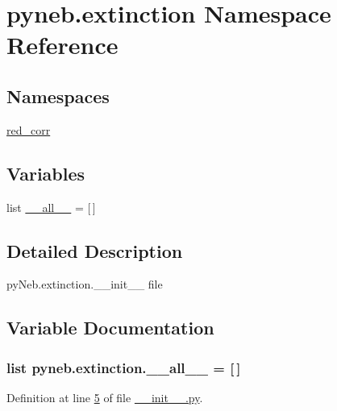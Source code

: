 \hypertarget{namespacepyneb_1_1extinction}{}\section{pyneb.\+extinction Namespace Reference}
\label{namespacepyneb_1_1extinction}
\subsection*{Namespaces}
\begin{DoxyCompactItemize}
\item 
 \hyperlink{namespacepyneb_1_1extinction_1_1red__corr}{red\+\_\+corr}
\end{DoxyCompactItemize}
\subsection*{Variables}
\begin{DoxyCompactItemize}
\item 
list \hyperlink{namespacepyneb_1_1extinction_ac47e2b9084a5ecfc36e3f0fad7ba3b5d}{\+\_\+\+\_\+all\+\_\+\+\_\+} = \mbox{[}$\,$\mbox{]}
\end{DoxyCompactItemize}


\subsection{Detailed Description}
\begin{DoxyVerb}pyNeb.extinction.__init__ file
\end{DoxyVerb}
 

\subsection{Variable Documentation}
\hypertarget{namespacepyneb_1_1extinction_ac47e2b9084a5ecfc36e3f0fad7ba3b5d}{}
\subsubsection[{\+\_\+\+\_\+all\+\_\+\+\_\+}]{\setlength{\rightskip}{0pt plus 5cm}list pyneb.\+extinction.\+\_\+\+\_\+all\+\_\+\+\_\+ = \mbox{[}$\,$\mbox{]}}\label{namespacepyneb_1_1extinction_ac47e2b9084a5ecfc36e3f0fad7ba3b5d}


Definition at line \hyperlink{extinction_2____init_____8py_source_l00005}{5} of file \hyperlink{extinction_2____init_____8py_source}{\+\_\+\+\_\+init\+\_\+\+\_\+.\+py}.

